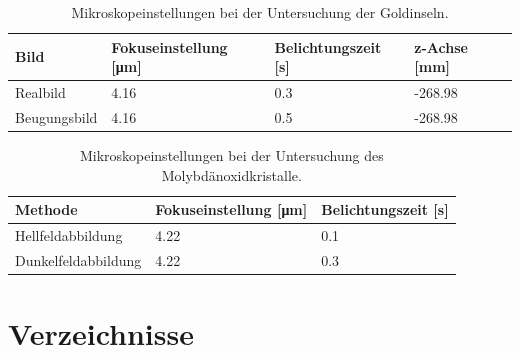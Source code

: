 \documentclass[slug=TEM, room=IFW, supervisor=?, coursedate=23.\ 01.\ 2020]{../../Lab_Report_LaTeX/lab_report}
\begin{document}
\begin{table}[h!]
	\centering
	\begin{tabular}{l|l|l|l}
		\toprule
		Bild & Fokuseinstellung [\si{\micro\metre}] & Belichtungszeit [\si{\second}] & z-Achse 	[\si{\milli\metre}]\\
		\midrule
		Realbild & 4.16 & 0.3 & -268.98\\
		Beugungsbild & 4.16 & 0.5 & -268.98
	\end{tabular}
	\caption{Mikroskopeinstellungen bei der Untersuchung der Goldinseln.}
	\label{tab:gold}
\end{table}

\begin{table}[h!]
	\centering
	\begin{tabular}{l|l|l}
	\toprule
	Methode & Fokuseinstellung [\si{\micro\metre}] & Belichtungszeit [\si{\second}]\\
	\midrule
	Hellfeldabbildung & 4.22 & 0.1\\
	Dunkelfeldabbildung & 4.22 & 0.3
	\end{tabular}
	\caption{Mikroskopeinstellungen bei der Untersuchung des Molybdänoxidkristalle.}
	\label{tab:molybdaen}
\end{table}

\newpage
\section{Verzeichnisse}
\label{sec:literatur}

\listoffigures

\listoftables

\printbibliography
\end{document}
